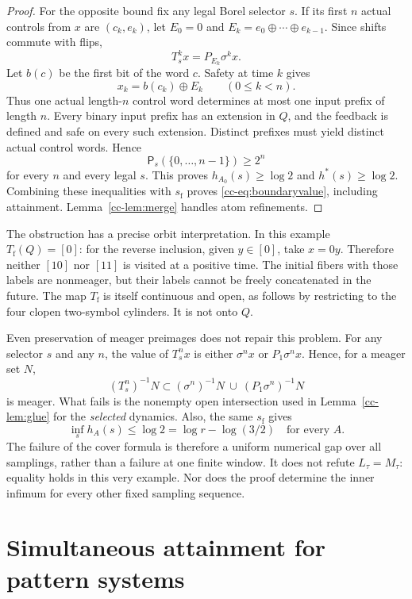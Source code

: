 \documentclass[11pt,reqno]{amsart}
\numberwithin{equation}{section}
\theoremstyle{definition}
\newcommand{\Patt}{\mathsf P}
\newcommand{\hpat}{h^{*}}
\begin{document}
\begin{proof}
For the opposite bound fix any legal Borel selector $s$. If its first
$n$ actual controls from $x$ are $(c_k,e_k)$, let
$E_0=0$ and $E_k=e_0\oplus\cdots\oplus e_{k-1}$. Since shifts commute
with flips,
\[
 T_s^k x=P_{E_k}\sigma^k x.
\]
Let $b(c)$ be the first bit of the word $c$. Safety at time $k$ gives
\begin{equation}\label{cc-eq:decode}
 x_k=b(c_k)\oplus E_k\qquad(0\le k<n).
\end{equation}
Thus one actual length-$n$ control word determines at most one input
prefix of length $n$. Every binary input prefix has an extension in
$Q$, and the feedback is defined and safe on every such extension.
Distinct prefixes must yield distinct actual control words. Hence
\[
 \Patt_s(\{0,\ldots,n-1\})\ge2^n
\]
for every $n$ and every legal $s$. This proves $h_{A_0}(s)\ge\log2$
and $\hpat(s)\ge\log2$. Combining these inequalities with
$s_{\mathrm f}$ proves \eqref{cc-eq:boundaryvalue}, including attainment.
Lemma~\ref{cc-lem:merge} handles atom refinements.
\end{proof}

The obstruction has a precise orbit interpretation. In this example
$T_{\mathrm f}(Q)=[0]$: for the reverse inclusion, given $y\in[0]$,
take $x=0y$. Therefore neither $[10]$ nor $[11]$ is visited at a
positive time. The initial fibers with those labels are nonmeager,
but their labels cannot be freely concatenated in the future.
The map $T_{\mathrm f}$ is itself continuous and open, as follows by
restricting to the four clopen two-symbol cylinders. It is not onto
$Q$.

Even preservation of meager preimages does not repair this problem.
For any selector $s$ and any $n$, the value of $T_s^n x$ is either
$\sigma^n x$ or $P_1\sigma^n x$. Hence, for a meager set $N$,
\[
 (T_s^n)^{-1}N\subset
 (\sigma^n)^{-1}N\ \cup\ (P_1\sigma^n)^{-1}N
\]
is meager. What fails is the nonempty open intersection used in
Lemma~\ref{cc-lem:glue} for the \emph{selected} dynamics. Also, the
same $s_{\mathrm f}$ gives
\[
 \inf_s h_A(s)\le\log2=\log r-\log(3/2)
 \quad\text{for every }A.
\]
The failure of the cover formula is therefore a uniform numerical
gap over all samplings, rather than a failure at one finite window.
It does not refute $L_\tau=M_\tau$: equality holds in this very example.
Nor does the proof determine the inner infimum for every other fixed
sampling sequence.



\section{Simultaneous attainment for pattern systems}\label{sec:comb}
\end{document}
